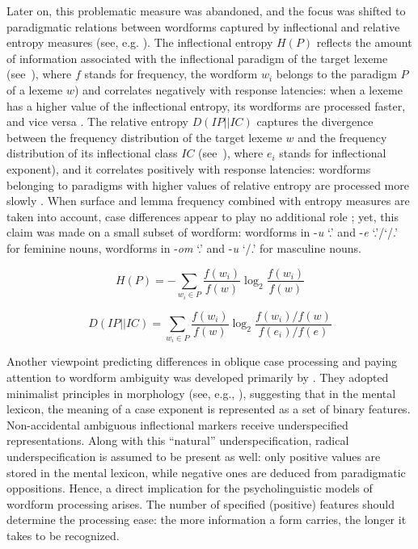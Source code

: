\documentclass[output=paper, modfonts,newtxmath,hidelinks]{langscibook}
\begin{document}
Later on, this problematic measure was abandoned, and the focus was shifted to paradigmatic relations between wordforms captured by inflectional and relative entropy measures (see, e.g. \citealt{milin2009simultaneous}). The inflectional entropy $H(P)$ reflects the amount of information associated with the inflectional paradigm of the target lexeme (see~), where $f$ stands for frequency, the wordform $w_i$ belongs to the paradigm $P$ of a lexeme $w$) and correlates negatively with response latencies: when a lexeme has a higher value of the inflectional entropy, its wordforms are processed faster, and vice versa  \citep{del2004putting}. The relative entropy $D(IP||IC)$ captures the divergence between the frequency distribution of the target lexeme $w$ and the frequency distribution of its inflectional class $IC$ (see~), where $e_i$ stands for inflectional exponent), and it correlates positively with response latencies: wordforms belonging to paradigms with higher values of relative entropy are processed more slowly \citep{milin2009simultaneous}. When surface and lemma frequency combined with entropy measures are taken into account, case differences appear to play no additional role \citep{milin2009simultaneous}; yet, this claim was made on a small subset of wordform: wordforms in -\textit{u} `{\accc.\sg}’ and -\textit{e} ‘{\genn.\sg}’\slash ‘{\nomm/\accc.\pl}’ for feminine nouns, wordforms in -\textit{om} `{\ins.\sg}’ and -\textit{u} `{\datt/\locc.\sg}’ for masculine nouns.

	\ea\label{equation:inflEntropy}\begin{equation*}
		H(P) = -\sum_{w_i \in P} \frac{f(w_i)}{f(w)} \log _2\frac{f(w_i)}{f(w)}
        \end{equation*}
	\z

\ea\label{equation:relEntr}\begin{equation*}
		D(IP||IC) = \sum_{w_i \in P} \frac{f(w_i)}{f(w)} \log _2 \frac{f(w_i)/f(w)}{f(e_i)/f(e)}
        \end{equation*}
	\z

\noindent Another viewpoint predicting differences in oblique case processing and paying attention to wordform ambiguity was developed primarily by \citet{clahsen2001mental}. They adopted minimalist principles in morphology (see, e.g., \citealt{wunderlich1996minimalist}), suggesting that in the mental lexicon, the meaning of a case exponent is represented as a set of binary features. Non-accidental ambiguous inflectional markers receive underspecified representations. Along with this ``natural'' underspecification, radical underspecification is assumed to be present as well: only positive values are stored in the mental lexicon, while negative ones are deduced from paradigmatic oppositions. Hence, a direct implication for the psycholinguistic models of wordform processing arises. The number of specified (positive) features should determine the processing ease: the more information a form carries, the longer it takes to be recognized.
\end{document}
